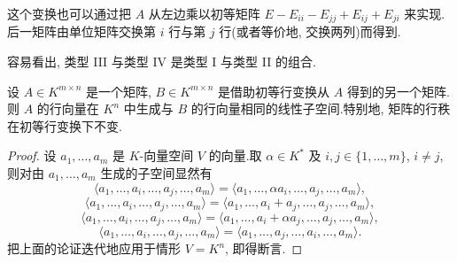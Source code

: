 这个变换也可以通过把 $A$ 从左边乘以初等矩阵 $E - E_{ii} - E_{jj} + E_{ij} + E_{ji}$ 来实现.后一矩阵由单位矩阵交换第 $i$ 行与第 $j$ 行(或者等价地, 交换两列)而得到.

容易看出, 类型 III 与类型 IV 是类型 I 与类型 II 的组合.

\begin{theorem}\label{thm:3.2.3}
设 $A \in K^{m \times n}$ 是一个矩阵, $B \in K^{m \times n}$ 是借助初等行变换从 $A$ 得到的另一个矩阵.则 $A$ 的行向量在 $K^n$ 中生成与 $B$ 的行向量相同的线性子空间.特别地, 矩阵的行秩在初等行变换下不变.
\end{theorem}

\begin{proof}
设 $a_1, \ldots, a_m$ 是 $K$-向量空间 $V$ 的向量.取 $\alpha \in K^*$ 及 $i, j \in \{1, \ldots, m\}$, $i \neq j$, 则对由 $a_1, \ldots, a_m$ 生成的子空间显然有
\[
\langle a_1, \ldots, a_i, \ldots, a_j, \ldots, a_m \rangle = \langle a_1, \ldots, \alpha a_i, \ldots, a_j, \ldots, a_m \rangle,
\]
\[
\langle a_1, \ldots, a_i, \ldots, a_j, \ldots, a_m \rangle = \langle a_1, \ldots, a_i + a_j, \ldots, a_j, \ldots, a_m \rangle,
\]
\[
\langle a_1, \ldots, a_i, \ldots, a_j, \ldots, a_m \rangle = \langle a_1, \ldots, a_i + \alpha a_j, \ldots, a_j, \ldots, a_m \rangle,
\]
\[
\langle a_1, \ldots, a_i, \ldots, a_j, \ldots, a_m \rangle = \langle a_1, \ldots, a_j, \ldots, a_i, \ldots, a_m \rangle\text{.}
\]
把上面的论证迭代地应用于情形 $V = K^n$, 即得断言.
\end{proof}

